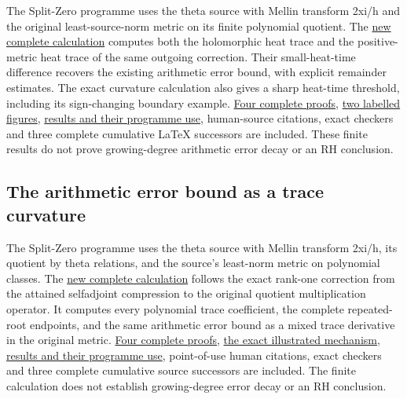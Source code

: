 \documentclass[
]{article}
\begin{document}
The Split-Zero programme uses the theta source with Mellin transform
2xi/h and the original least-source-norm metric on its finite polynomial
quotient. The
\href{https://github.com/KokunoYumeto/zeta-function-research-reader/blob/main/workbenches/splitzero-tandem/continuations/20260920-native-heat-action/README.md}{new
complete calculation} computes both the holomorphic heat trace and the
positive-metric heat trace of the same outgoing correction. Their
small-heat-time difference recovers the existing arithmetic error bound,
with explicit remainder estimates. The exact curvature calculation also
gives a sharp heat-time threshold, including its sign-changing boundary
example.
\href{https://github.com/KokunoYumeto/zeta-function-research-reader/blob/main/workbenches/splitzero-tandem/continuations/20260920-native-heat-action/COMPLETE_PROOFS.tex}{Four
complete proofs},
\href{https://github.com/KokunoYumeto/zeta-function-research-reader/blob/main/workbenches/splitzero-tandem/continuations/20260920-native-heat-action/FIGURE_CAPTION.md}{two
labelled figures},
\href{https://github.com/KokunoYumeto/zeta-function-research-reader/blob/main/workbenches/splitzero-tandem/continuations/20260920-native-heat-action/RESULT_INDEX.json}{results
and their programme use}, human-source citations, exact checkers and
three complete cumulative LaTeX successors are included. These finite
results do not prove growing-degree arithmetic error decay or an RH
conclusion.

\subsection{The arithmetic error bound as a trace
curvature}\label{the-arithmetic-error-bound-as-a-trace-curvature}

The Split-Zero programme uses the theta source with Mellin transform
2xi/h, its quotient by theta relations, and the source's least-norm
metric on polynomial classes. The
\href{https://github.com/KokunoYumeto/zeta-function-research-reader/blob/main/workbenches/splitzero-tandem/continuations/20260920-native-spectral-action/README.md}{new
complete calculation} follows the exact rank-one correction from the
attained selfadjoint compression to the original quotient multiplication
operator. It computes every polynomial trace coefficient, the complete
repeated-root endpoints, and the same arithmetic error bound as a mixed
trace derivative in the original metric.
\href{https://github.com/KokunoYumeto/zeta-function-research-reader/blob/main/workbenches/splitzero-tandem/continuations/20260920-native-spectral-action/COMPLETE_PROOFS.tex}{Four
complete proofs},
\href{https://github.com/KokunoYumeto/zeta-function-research-reader/blob/main/workbenches/splitzero-tandem/continuations/20260920-native-spectral-action/FIGURE_CAPTION.md}{the
exact illustrated mechanism},
\href{https://github.com/KokunoYumeto/zeta-function-research-reader/blob/main/workbenches/splitzero-tandem/continuations/20260920-native-spectral-action/RESULT_INDEX.json}{results
and their programme use}, point-of-use human citations, exact checkers
and three complete cumulative source successors are included. The finite
calculation does not establish growing-degree error decay or an RH
conclusion.
\end{document}
